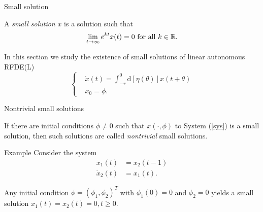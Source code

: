 \begin{frame}[t]{Small solution}
  \begin{definition}
    A \textit{small solution} $x$ is a solution such that 
    \begin{equation}
      \lim_{t\to \infty}e^{kt}x(t)=0  \text{ for all }k\in \mathbb{R}.
    \end{equation}
  \end{definition}
In this section we study the existence of small solutions of linear autonomous RFDE(L)
\begin{equation}\label{sys}
  \left\{
    \begin{aligned} 
     & \dot{x}(t)=\int_{-r}^{0}\mathrm{d}[\eta(\theta)]x(t+\theta) \\
     & x_0=\phi. 
    \end{aligned} 
    \right.
\end{equation}
\end{frame}

\begin{frame}[t]{Nontrivial small solutions}
  \begin{definition}
    If there are initial conditions $\phi\neq 0$ such that $x(\cdot ,\phi)$ to System (\ref{sys}) is a small solution, then such solutions are called  \textit{nontrivial} small solutions.
  \end{definition}
  \begin{exampleblock}{Example}
    Consider the system 
    \begin{equation}
      \begin{aligned}
	\dot{x}_1(t)&=x_2(t-1)\\
	\dot{x}_2(t)&=x_1(t).
      \end{aligned}
    \end{equation}
  \end{exampleblock}
  Any initial condition $\phi=(\phi_1,\phi_2)^{T}$ with $\phi_1(0)=0$ and $\phi_2=0$ yields a small solution $x_1(t)=x_2(t)=0,t\ge 0$.
\end{frame}

\begin{frame}[t]
\end{frame}

\begin{frame}[t]
\end{frame}

\begin{frame}[t]
\end{frame}

\begin{frame}[t]
\end{frame}


